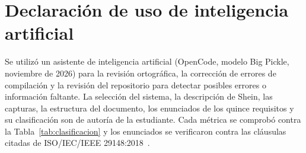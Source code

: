 \documentclass[11pt,a4paper]{article}
\begin{document}
\section{Declaración de uso de inteligencia artificial}
\label{sec:ia}

Se utilizó un asistente de inteligencia artificial (OpenCode, modelo Big
Pickle, noviembre de 2026) para la revisión ortográfica, la corrección de
errores de compilación y la revisión del repositorio para detectar posibles
errores o información faltante. La selección del sistema, la descripción de
Shein, las capturas, la estructura del documento, los enunciados de los
quince requisitos y su clasificación son de autoría de la estudiante. Cada
métrica se comprobó contra la Tabla~\ref{tab:clasificacion} y los enunciados
se verificaron contra las cláusulas citadas de ISO/IEC/IEEE
29148:2018~\cite{iso29148}.



\end{document}

